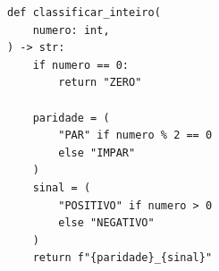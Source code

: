 \ifmostrarGabarito
\begin{verbatim}
def classificar_inteiro(
    numero: int,
) -> str:
    if numero == 0:
        return "ZERO"
    
    paridade = (
        "PAR" if numero % 2 == 0
        else "IMPAR"
    )
    sinal = (
        "POSITIVO" if numero > 0
        else "NEGATIVO"
    )
    return f"{paridade}_{sinal}" 
\end{verbatim}

\fi
